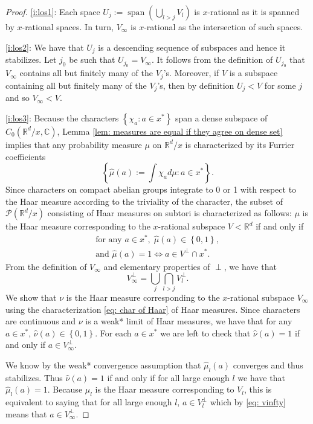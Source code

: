 \documentclass[reqno,11pt, twoside]{amsart}
\theoremstyle{plain}
\theoremstyle{definition}
\theoremstyle{definition}
\theoremstyle{remark}
\numberwithin{equation}{section}
\newcommand{\cP}{\mathcal{P}}
\newcommand{\bC}{\mathbb{C}}
\newcommand{\bR}{\mathbb{R}}
\newcommand\seta[1]{\left\{#1\right\}}
\newcommand\pa[1]{\left(#1\right)}
\newcommand\on[1]{\operatorname{#1}}
\begin{document}
\begin{proof}
\eqref{i:los1}: Each space $U_j:=\on{span}\pa{\bigcup_{l>j}V_l}$ is $x$-rational as it is spanned by $x$-rational spaces. In turn, $V_\infty$ is $x$-rational as the intersection of such spaces. 

\eqref{i:los2}: We have that $U_j$ is a descending sequence of subspaces and hence it stabilizes. Let $j_0$ be such that $U_{j_0} = V_\infty$. It follows from the definition of $U_{j_0}$ that $V_\infty$ contains all but finitely many of the $V_j$'s. Moreover, if $V$ is a subspace containing all but finitely many of the $V_j$'s, then by definition $U_j<V$ for some $j$ and so 
$V_\infty<V$. 

\eqref{i:los3}:
Because the characters $\seta{\chi_a:a\in x^*}$ span a dense subspace of 
$C_0(\bR^d/x,\bC)$, Lemma \ref{lem: measures are equal if they agree on dense set} implies that any probability measure $\mu$ on $\bR^d/x$ is characterized by its Furrier coefficients $$\seta{\hat{\mu}(a):=\int \chi_a d\mu: a\in x^*}.$$ Since characters on compact abelian groups integrate to 0 or 1 with respect to the Haar measure according to the triviality of the character, the 
subset of $\cP(\bR^d/x)$ consisting of Haar measures on subtori is characterized as follows: $\mu$ is the Haar measure corresponding to the $x$-rational 
subspace $V<\bR^d$ if and only if
\begin{equation}\label{eq: char of Haar}
\begin{array}{l}
\textrm{for any } a\in x^*,\;\hat{\mu}(a) \in\seta{0,1},\\
\textrm{and }\hat{\mu}(a)=1 \Longleftrightarrow a\in V^\perp\cap x^*.
\end{array}
\end{equation}
From the definition of $V_\infty$ and elementary properties of $\perp$, we have that 
\begin{equation}
    \label{eq: vinfty}
    V_\infty^\perp =  \bigcup_j\bigcap_{l>j}V_l^\perp.
\end{equation}
We show that $\nu$ is the Haar measure corresponding to the $x$-rational subspace $V_\infty$ using the characterization \eqref{eq: char of Haar} of Haar measures. Since characters are continuous and $\nu$ is a weak* limit of Haar measures, we have that for any $a\in x^*$, $\hat{\nu}(a)\in \seta{0,1}$. For each $a\in x^*$ we are left to check that $\hat{\nu}(a)=1$ if and only if $a\in V_\infty^\perp.$ 

We know by the weak* convergence assumption that 
$\hat{\mu}_l(a)$ converges and thus stabilizes. Thus $\hat{\nu}(a) =1$ if and only if for all large enough $l$ we have that $\hat{\mu}_l(a)=1$. Because $\mu_l$ is the Haar measure corresponding to $V_l$, this is equivalent to saying that for all large enough $l$, $a\in V_l^\perp$ which by \eqref{eq: vinfty} means that $a\in V_\infty^\perp$.


\end{proof}
\end{document}
